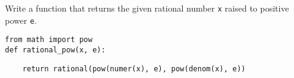 \question Write a function that returns the given rational number {\tt x}
raised to positive power {\tt e}.
\begin{lstlisting}
from math import pow
def rational_pow(x, e):
\end{lstlisting}
\begin{solution}[1in]
\begin{lstlisting}
    return rational(pow(numer(x), e), pow(denom(x), e))
\end{lstlisting}
\end{solution}
